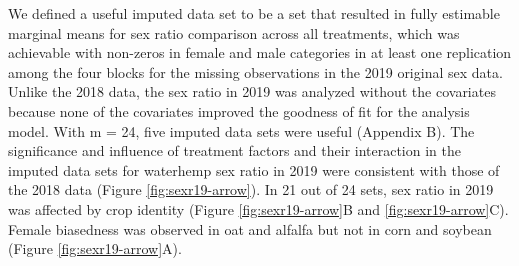\documentclass[
]{article}
\begin{document}
We defined a useful imputed data set to be a set that resulted in fully estimable marginal means for sex ratio comparison across all treatments, which was achievable with non-zeros in female and male categories in at least one replication among the four blocks for the missing observations in the 2019 original sex data. Unlike the 2018 data, the sex ratio in 2019 was analyzed without the covariates because none of the covariates improved the goodness of fit for the analysis model. With m = 24, five imputed data sets were useful (Appendix B). The significance and influence of treatment factors and their interaction in the imputed data sets for waterhemp sex ratio in 2019 were consistent with those of the 2018 data (Figure \ref{fig:sexr19-arrow}). In 21 out of 24 sets, sex ratio in 2019 was affected by crop identity (Figure \ref{fig:sexr19-arrow}B and \ref{fig:sexr19-arrow}C). Female biasedness was observed in oat and alfalfa but not in corn and soybean (Figure \ref{fig:sexr19-arrow}A).
\end{document}
